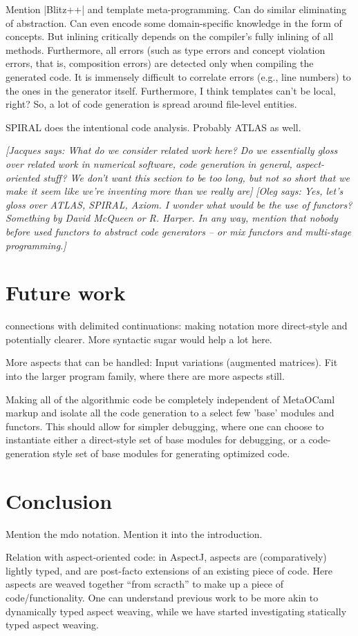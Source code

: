 \documentclass{llncs}
\newcommand{\oleg}[1]{{\it [Oleg says: #1]}}
\newcommand{\jacques}[1]{{\it [Jacques says: #1]}}
\begin{document}
Mention |Blitz++| and template meta-programming. Can do similar
eliminating of abstraction. Can even encode some domain-specific
knowledge in the form of concepts. But inlining critically depends on
the compiler's fully inlining of all methods. Furthermore, all errors
(such as type errors and concept violation errors, that is,
composition errors) are detected only when compiling the generated
code. It is immensely difficult to correlate errors (e.g., line numbers) 
to the ones in the generator itself. Furthermore, I think templates
can't be local, right? So, a lot of code generation is spread around
file-level entities. 

SPIRAL does the intentional code analysis. Probably ATLAS as well.

\jacques{What do we consider \emph{related work} here?  Do we essentially gloss 
over related work in numerical software, code generation in general,
aspect-oriented stuff?  We don't want this section to be too long, but
not so short that we make it seem like we're inventing more than we
really are}
\oleg{Yes, let's gloss over ATLAS, SPIRAL, Axiom. I wonder what would
  be the use of functors? Something by David McQueen or R. Harper.
  In any way, mention that nobody before used functors to abstract
  code generators -- or mix functors and multi-stage programming.}


\section{Future work}\label{future}
connections with delimited continuations: making notation
more direct-style and potentially clearer.  More syntactic sugar
would help a lot here.

More aspects that can be handled: Input variations (augmented
matrices). Fit into the larger program family, where there are
more aspects still.

Making all of the algorithmic code be completely independent of 
MetaOCaml markup and isolate all the code generation to a select
few 'base' modules and functors.  This should allow for simpler
debugging, where one can choose to instantiate either a direct-style
set of base modules for debugging, or a code-generation style set
of base modules for generating optimized code.

\section{Conclusion}\label{conclusion}
Mention the mdo notation. Mention it into the introduction.

Relation with aspect-oriented code: in AspectJ, aspects are (comparatively)
lightly typed, and are post-facto extensions of an existing piece of
code.  Here aspects are weaved together ``from scracth'' to make up a
piece of code/functionality.  One can understand previous work to be
more akin to dynamically typed aspect weaving, while we have started
investigating statically typed aspect weaving.



\end{document}

